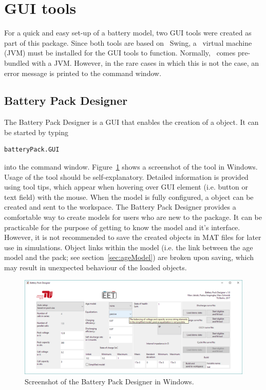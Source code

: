 \section{GUI tools}
\label{sec:GUI}
For a quick and easy set-up of a battery model, two GUI tools were created as part of this package. Since both tools are based on \java\ Swing, a \java\ virtual machine (JVM) must be installed for the GUI tools to function. Normally, \matlab\ comes pre-bundled with a JVM. However, in the rare cases in which this is not the case, an error message is printed to the command window.

\subsection{Battery Pack Designer}
\label{sec:designer}
The Battery Pack Designer is a GUI that enables the creation of a  object. It can be started by typing
\begin{lstlisting}
batteryPack.GUI
\end{lstlisting}
into the command window. Figure~\ref{fig:Designer} shows a screenshot of the tool in Windows. Usage of the tool should be self-explanatory. Detailed information is provided using tool tips, which appear when hovering over GUI element (i.e. button or text field) with the mouse. When the model is fully configured, a  object can be created and sent to the workspace. The Battery Pack Designer provides a comfortable way to create models for users who are new to the package. It can be practicable for the purpose of getting to know the model and it's interface. \\
However, it is not recommended to save the created objects in MAT files for later use in simulations. Object links within the model (i.e. the link between the age model and the pack; see section~\ref{sec:ageModel}) are broken upon saving, which may result in unexpected behaviour of the loaded objects. 
\begin{figure}[b!]
	\captionsetup{type=figure}
	\centering
	\includegraphics[width=\textwidth]{Designer.png}
	\caption[Screenshot of the Battery Pack Designer in Windows]{Screenshot of the Battery Pack Designer in Windows.}
	\label{fig:Designer}
\end{figure}
